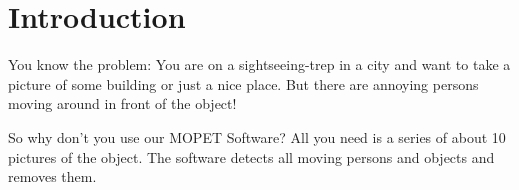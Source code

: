 \chapter{Introduction}

You know the problem: You are on a sightseeing-trep in a city and want to take a picture of some
building or just a nice place. But there are annoying persons moving around in front
of the object!

So why don't you use our MOPET Software?
All you need is a series of about 10 pictures of the object. The software 
detects all moving persons and objects and removes them.











